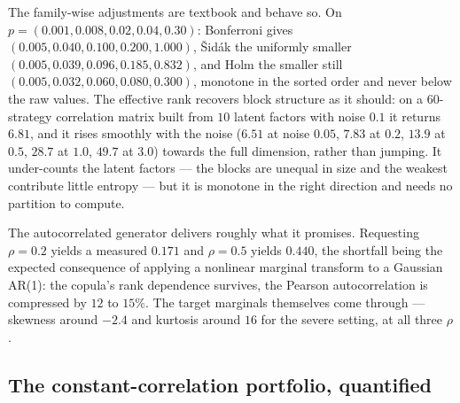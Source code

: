\documentclass[11pt,a4paper]{article}
\begin{document}
The family-wise adjustments are textbook and behave so. On
$p = (0.001, 0.008, 0.02, 0.04, 0.30)$: Bonferroni gives
$(0.005, 0.040, 0.100, 0.200, 1.000)$, {\v S}id{\'a}k the uniformly smaller
$(0.005, 0.039, 0.096, 0.185, 0.832)$, and Holm the smaller still
$(0.005, 0.032, 0.060, 0.080, 0.300)$, monotone in the sorted order and never
below the raw values. The effective rank recovers block structure as it
should: on a $60$-strategy correlation matrix built from $10$ latent factors
with noise $0.1$ it returns $6.81$, and it rises smoothly with the noise
($6.51$ at noise $0.05$, $7.83$ at $0.2$, $13.9$ at $0.5$, $28.7$ at $1.0$,
$49.7$ at $3.0$) towards the full dimension, rather than jumping. It
under-counts the latent factors --- the blocks are unequal in size and the
weakest contribute little entropy --- but it is monotone in the right
direction and needs no partition to compute.

The autocorrelated generator delivers roughly what it promises. Requesting
$\rho = 0.2$ yields a measured $0.171$ and $\rho = 0.5$ yields $0.440$, the
shortfall being the expected consequence of applying a nonlinear marginal
transform to a Gaussian AR(1): the copula's rank dependence survives, the
Pearson autocorrelation is compressed by $12$ to $15\%$. The target marginals
themselves come through --- skewness around $-2.4$ and kurtosis around $16$
for the severe setting, at all three $\rho$.

\subsection{The constant-correlation portfolio, quantified}
\end{document}
